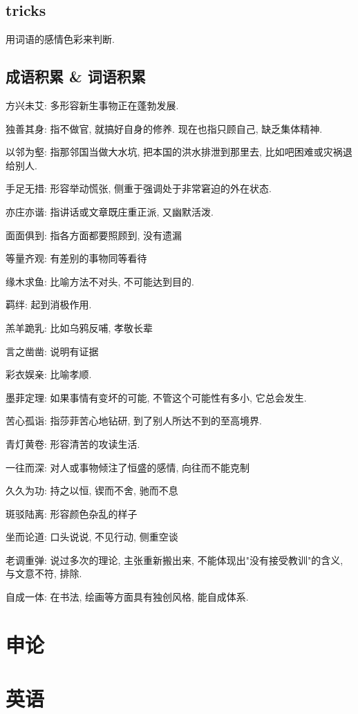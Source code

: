 \documentclass[UTF8]{ctexart}
\begin{document}
\subsection{tricks}

用词语的感情色彩来判断.

\subsection{成语积累 \& 词语积累}
方兴未艾: 多形容新生事物正在蓬勃发展.

独善其身: 指不做官, 就搞好自身的修养. 现在也指只顾自己, 缺乏集体精神.

以邻为壑: 指那邻国当做大水坑, 把本国的洪水排泄到那里去, 比如吧困难或灾祸退给别人.

手足无措: 形容举动慌张, 侧重于强调处于非常窘迫的外在状态.

亦庄亦谐: 指讲话或文章既庄重正派, 又幽默活泼.

面面俱到: 指各方面都要照顾到, 没有遗漏

等量齐观: 有差别的事物同等看待

缘木求鱼: 比喻方法不对头, 不可能达到目的.

羁绊: 起到消极作用.

羔羊跪乳: 比如乌鸦反哺, 孝敬长辈

言之凿凿: 说明有证据

彩衣娱亲: 比喻孝顺.

墨菲定理: 如果事情有变坏的可能, 不管这个可能性有多小, 它总会发生.

苦心孤诣: 指莎菲苦心地钻研, 到了别人所达不到的至高境界.

青灯黄卷: 形容清苦的攻读生活.

一往而深: 对人或事物倾注了恒盛的感情, 向往而不能克制

久久为功: 持之以恒, 锲而不舍, 驰而不息

斑驳陆离: 形容颜色杂乱的样子

坐而论道: 口头说说, 不见行动, 侧重空谈

老调重弹: 说过多次的理论, 主张重新搬出来, 不能体现出"没有接受教训"的含义, 与文意不符, 排除.

自成一体: 在书法, 绘画等方面具有独创风格, 能自成体系.

\section{申论}



\section{英语}
\end{document}
